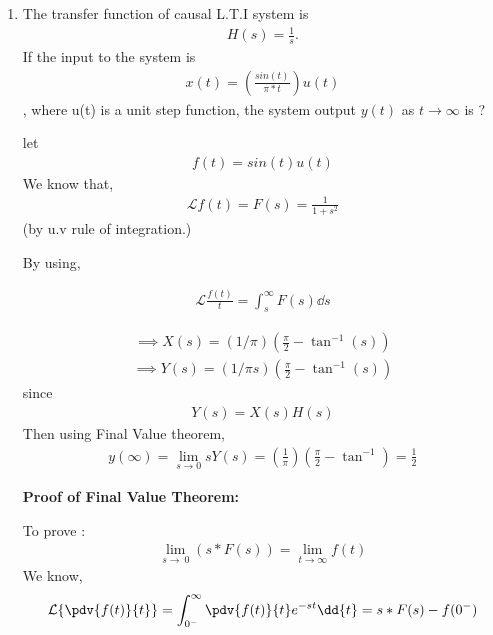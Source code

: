 \begin{enumerate}[label=\thesection.\arabic*.,ref=\thesection.\theenumi]
\item The transfer function of causal L.T.I system is 
\begin{align}
H(s) = \frac{1}{s}. 
\end{align}If the input to the system is 
\begin{align}
x(t) = (\frac{sin(t)}{\pi*t})u(t)
\end{align}
, where u(t) is a unit step function, the system output 
$y(t)$ as $t \to \infty$  is ?

\solution
let
\begin{align}
    f(t) = sin(t)u(t)
\end{align}
We know that, 
\begin{align}
\mathcal{L}{f(t)} = F(s) = \frac{1}{1 + s^2} 
\end{align}
    (by u.v rule of integration.)

By using,  

\begin{align}
  \mathcal{L}{\frac{f(t)}{t}} = \int_{s}^{\infty}F(s) \dd{s} 
\end{align}

\begin{align}
\implies X(s) = (1/ \pi)( \frac{\pi}{2} - \tan^{-1}(s))
\end{align}
\begin{align}
\implies Y(s) = (1/ \pi s) ( \frac{\pi}{2} - \tan^{-1}(s)) 
\end{align}
since 
\begin{align}
Y(s) = X(s)H(s)
\end{align}
Then using Final Value theorem,
\begin{align}
y(\infty) = \lim_{s\to 0} sY(s) =(\frac{1}{\pi}) ( \frac{\pi}{2} - \tan^{-1}) = \frac{1}{2}
\end{align}





\textbf{ Proof of Final Value Theorem:}

To prove : 
\begin{align}
 \lim_{s\to\ 0} (s*F(s)) = \lim_{t\to\infty} f(t)
\end{align}
We know,
\begin{align}
\mathcal{L}\{\pdv{f(t)}{t}\} = \int_{0^-}^{\infty} \pdv{f(t)}{t} e^{-st}\dd{t} =s*F(s)-f(0^{-})
\end{align}


\end{enumerate}
